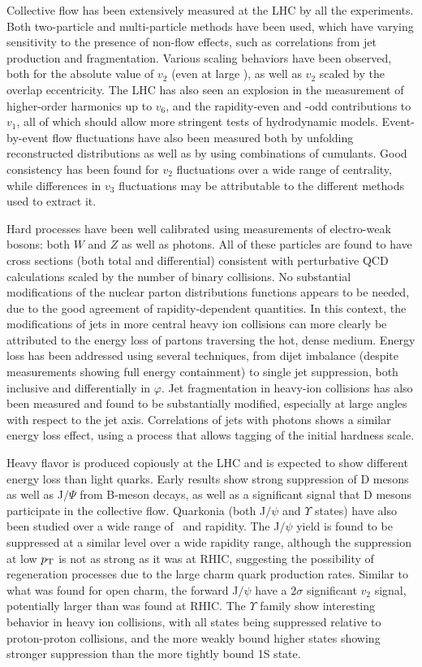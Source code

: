 Collective flow has been extensively measured at the LHC by all the experiments.
Both two-particle and multi-particle methods have been used, which have varying sensitivity to
the presence of non-flow effects, such as correlations from jet production and fragmentation.
Various scaling behaviors have been observed, both for the absolute value of $v_2$ (even at
large \pT), as well as $v_2$ scaled by the overlap eccentricity.
The LHC has also seen an explosion in the measurement of higher-order harmonics up to $v_6$,
and the rapidity-even and -odd contributions to $v_1$, all of which should
allow more stringent tests of hydrodynamic models.
Event-by-event flow fluctuations have also been measured both by unfolding reconstructed
distributions as well as by using combinations of cumulants.  Good consistency has been found
for $v_2$ fluctuations over a wide range of centrality, while differences in $v_3$
fluctuations may be attributable to the different methods used to extract it.

Hard processes have been well calibrated using measurements of electro-weak bosons: both
$W$ and $Z$ as well as photons.  All of these particles are found to have cross sections
(both total and differential)
consistent with perturbative QCD calculations scaled by the number of binary collisions.
No substantial modifications of the nuclear parton distributions functions appears to be needed, due to the good
agreement of rapidity-dependent quantities.
In this context, the modifications of jets in more central heavy ion collisions can more
clearly be attributed to the energy loss of partons traversing the hot, dense medium.
Energy loss has been addressed using several techniques, from dijet imbalance (despite measurements
showing full energy containment) to
single jet suppression, both inclusive and differentially in $\varphi$.  Jet fragmentation
in heavy-ion collisions has also been measured and found to be substantially modified, especially at
large angles with respect to the jet axis.
Correlations of jets with photons shows a similar energy loss effect, using a process that allows
tagging of the initial hardness scale.

Heavy flavor is produced copiously at the LHC and is expected to show different energy loss than
light quarks.  Early results show strong suppression of D mesons as well as J$/\Psi$ from
B-meson decays, as well as a significant signal that D mesons participate in the collective flow.
Quarkonia (both J$/\psi$ and $\Upsilon$ states) have also been studied over a wide range of \pT\
and rapidity.  The J$/\psi$ yield is found to be suppressed at a similar level over a wide
rapidity range, although the suppression at low $\mbox{$p_{\mathrm{T}}$}$ is not as strong as it was at
RHIC, suggesting the possibility of regeneration processes due to the large charm quark production
rates.  Similar to what was found for open charm, the forward J$/\psi$ have a
$2\sigma$ significant $v_2$ signal, potentially larger than was found at RHIC.
The $\Upsilon$ family show interesting behavior in heavy ion collisions, with all states being
suppressed relative to proton-proton collisions, and the more weakly bound higher states showing
stronger suppression than the more tightly bound 1S state.


